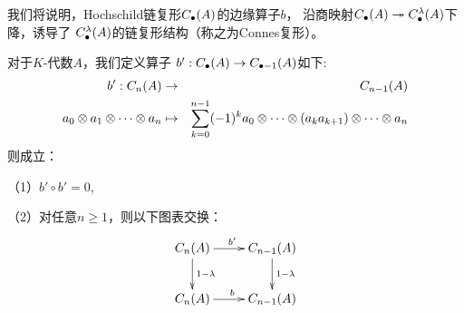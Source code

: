 我们将说明，Hochschild链复形$C_{\bullet}(A)$的边缘算子$b$，
沿商映射$C_{\bullet}(A)\twoheadrightarrow C^{\lambda}_{\bullet}(A)$下降，诱导了
$C_{\bullet}^{\lambda}(A)$的链复形结构（称之为Connes复形）。













\begin{lemma}
对于$K$-代数$A$，我们定义算子
$b':C_{\bullet}(A)\to C_{\bullet-1}(A)$如下:
\begin{eqnarray*}
b':C_{n}(A)&\to&C_{n-1}(A)\\
a_0\otimes a_1\otimes\cdots\otimes a_n&\mapsto&
\sum_{k=0}^{n-1}(-1)^{k}
a_0\otimes\cdots\otimes(a_ka_{k+1})\otimes\cdots\otimes a_n
\end{eqnarray*}
则成立：

（1）$b'\circ b'=0$,

（2）对任意$n\geq 1$，则以下图表交换：
$$\xymatrix{
     C_n(A) \ar[d]^{1-\lmd} \ar[r]^{b'}
   & C_{n-1}(A)\ar[d]^{1-\lmd}
\\
     C_n(A) \ar[r]^b
   & C_{n-1}(A)
}$$
\end{lemma}

